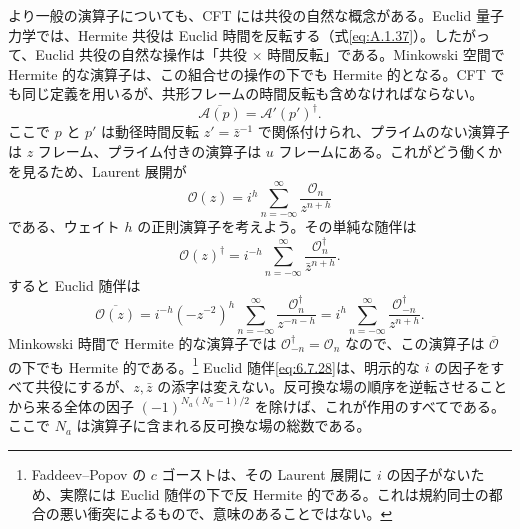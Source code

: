 より一般の演算子についても、CFT には共役の自然な概念がある。Euclid 量子力学では、Hermite 共役は Euclid 時間を反転する（式\eqref{eq:A.1.37}）。したがって、Euclid 共役の自然な操作は「共役 $\times$ 時間反転」である。Minkowski 空間で Hermite 的な演算子は、この組合せの操作の下でも Hermite 的となる。CFT でも同じ定義を用いるが、共形フレームの時間反転も含めなければならない。
\begin{equation}
\overline{\mathcal A(p)}=\mathcal A'(p')^\dagger.
\tag{6.7.28}\label{eq:6.7.28}
\end{equation}
ここで $p$ と $p'$ は動径時間反転 $z'=\bar z^{-1}$ で関係付けられ、プライムのない演算子は $z$ フレーム、プライム付きの演算子は $u$ フレームにある。これがどう働くかを見るため、Laurent 展開が
\begin{equation}
\mathcal O(z)=i^h\sum_{n=-\infty}^{\infty}\frac{\mathcal O_n}{z^{n+h}}
\tag{6.7.29}\label{eq:6.7.29}
\end{equation}
である、ウェイト $h$ の正則演算子を考えよう。その単純な随伴は
\begin{equation}
\mathcal O(z)^\dagger
=i^{-h}\sum_{n=-\infty}^{\infty}
\frac{\mathcal O_n^\dagger}{\bar z^{n+h}}.
\tag{6.7.30}\label{eq:6.7.30}
\end{equation}
すると Euclid 随伴は
\begin{equation}
\overline{\mathcal O(z)}
=i^{-h}(-z^{-2})^h
\sum_{n=-\infty}^{\infty}\frac{\mathcal O_n^\dagger}{z^{-n-h}}
=i^h\sum_{n=-\infty}^{\infty}\frac{\mathcal O_{-n}^\dagger}{z^{n+h}}.
\tag{6.7.31}\label{eq:6.7.31}
\end{equation}
Minkowski 時間で Hermite 的な演算子では $\mathcal O_{-n}^\dagger=\mathcal O_n$ なので、この演算子は $\overline{\mathcal O}$ の下でも Hermite 的である。\footnote[3]{Faddeev--Popov の $c$ ゴーストは、その Laurent 展開に $i$ の因子がないため、実際には Euclid 随伴の下で反 Hermite 的である。これは規約同士の都合の悪い衝突によるもので、意味のあることではない。}
Euclid 随伴\eqref{eq:6.7.28}は、明示的な $i$ の因子をすべて共役にするが、$z,\bar z$ の添字は変えない。反可換な場の順序を逆転させることから来る全体の因子 $(-1)^{N_a(N_a-1)/2}$ を除けば、これが作用のすべてである。ここで $N_a$ は演算子に含まれる反可換な場の総数である。

